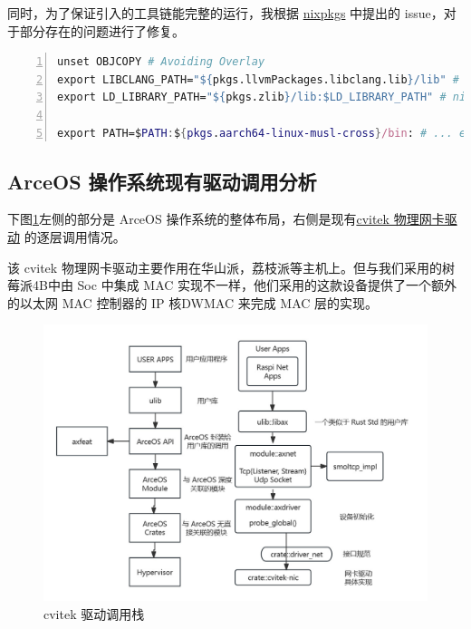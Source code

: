     同时，为了保证引入的工具链能完整的运行，我根据 \href{}{nixpkgs} 中提出的 issue，对于部分存在的问题进行了修复。

    \begin{lstlisting}[language=nix
        , caption=flakes 特殊适配
        , numbers = left
        , breaklines=true
        , breakatwhitespace=true]
unset OBJCOPY # Avoiding Overlay
export LIBCLANG_PATH="${pkgs.llvmPackages.libclang.lib}/lib" # nixpkgs@52447
export LD_LIBRARY_PATH="${pkgs.zlib}/lib:$LD_LIBRARY_PATH" # nixpkgs@92946

export PATH=$PATH:${pkgs.aarch64-linux-musl-cross}/bin: # ... etc
    \end{lstlisting}


\subsection{ArceOS 操作系统现有驱动调用分析}

    下图\ref{fig::cvitek}左侧的部分是 ArceOS 操作系统的整体布局，右侧是现有\href{https://github.com/yuoo655/arceos_net/tree/hsp}{cvitek 物理网卡驱动} 的逐层调用情况。

    该 cvitek 物理网卡驱动主要作用在华山派，荔枝派等主机上。但与我们采用的树莓派4B中由 Soc 中集成 MAC 实现不一样，他们采用的这款设备提供了一个额外的以太网 MAC 控制器的 IP 核DWMAC 来完成 MAC 层的实现。

        
    \begin{figure}[ht]
        \centering
        \includegraphics[scale=0.4]{imgs/cvitek.jpg}
        \caption{cvitek 驱动调用栈}    \label{fig::cvitek}
    \end{figure}

